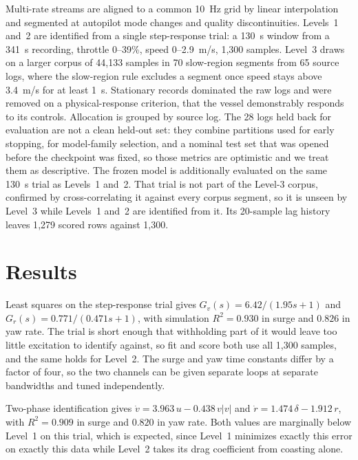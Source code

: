 \documentclass[conference]{IEEEtran}
\begin{document}
Multi-rate streams are aligned to a common 10~Hz grid by linear interpolation and segmented at autopilot mode changes and quality discontinuities. Levels~1 and~2 are identified from a single step-response trial: a 130~s window from a 341~s recording, throttle 0--39\%, speed 0--2.9~m/s, 1{,}300 samples. Level~3 draws on a larger corpus of 44{,}133 samples in 70 slow-region segments from 65 source logs, where the slow-region rule excludes a segment once speed stays above 3.4~m/s for at least 1~s. Stationary records dominated the raw logs and were removed on a physical-response criterion, that the vessel demonstrably responds to its controls. Allocation is grouped by source log. The 28 logs held back for evaluation are not a clean held-out set: they combine partitions used for early stopping, for model-family selection, and a nominal test set that was opened before the checkpoint was fixed, so those metrics are optimistic and we treat them as descriptive. The frozen model is additionally evaluated on the same 130~s trial as Levels~1 and~2. That trial is not part of the Level-3 corpus, confirmed by cross-correlating it against every corpus segment, so it is unseen by Level~3 while Levels~1 and~2 are identified from it. Its 20-sample lag history leaves 1{,}279 scored rows against 1{,}300.

\section{Results}
\label{sec:results}

Least squares on the step-response trial gives $G_v(s)=6.42/(1.95s+1)$ and $G_r(s)=0.771/(0.471s+1)$, with simulation $R^2=0.930$ in surge and $0.826$ in yaw rate. The trial is short enough that withholding part of it would leave too little excitation to identify against, so fit and score both use all 1{,}300 samples, and the same holds for Level~2. 
The surge and yaw time constants differ by a factor of four, so the two channels can be given separate loops at separate bandwidths and tuned independently.

Two-phase identification gives $\dot v = 3.963\,u - 0.438\,v|v|$ and $\dot r = 1.474\,\delta - 1.912\,r$, with $R^2=0.909$ in surge and $0.820$ in yaw rate. Both values are marginally below Level~1 on this trial, which is expected, since Level~1 minimizes exactly this error on exactly this data while Level~2 takes its drag coefficient from coasting alone.
\end{document}
